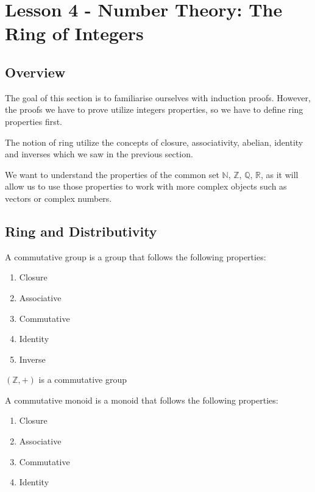 \documentclass{article}
\begin{document}
\section{Lesson 4 - Number Theory: The Ring of Integers}

\subsection{Overview}

The goal of this section is to familiarise ourselves with induction proofs. However,
the proofs we have to prove utilize integers properties, so we have to define
ring properties first.

The notion of ring utilize the concepts of closure, associativity, abelian,
identity and inverses which we saw in the previous section.

We want to understand the properties of the common set $\mathbb{N}$, $\mathbb{Z}$,
$\mathbb{Q}$, $\mathbb{R}$, as it will allow us to use those properties to work
with more complex objects such as vectors or complex numbers.

\subsection{Ring and Distributivity}

\begin{definition}
    A commutative group is a group that follows the following properties:
    \begin{enumerate}
	\item Closure
	\item Associative
	\item Commutative
	\item Identity
	\item Inverse
    \end{enumerate}
\end{definition}

\begin{lemma}
    $ (\mathbb{Z} , +) $ is a commutative group
\end{lemma}

\begin{definition}
    A commutative monoid is a monoid that follows the following properties:
    \begin{enumerate}
	\item Closure
	\item Associative
	\item Commutative
	\item Identity
    \end{enumerate}
\end{definition}
\end{document}
